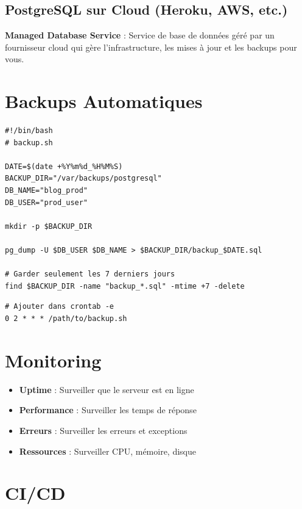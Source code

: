 \subsection{PostgreSQL sur Cloud (Heroku, AWS, etc.)}

\begin{definitionbox}
    \textbf{Managed Database Service} : Service de base de données géré par un fournisseur cloud qui gère l'infrastructure, les mises à jour et les backups pour vous.
\end{definitionbox}

\section{Backups Automatiques}

\begin{lstlisting}[style=bash, caption=Script de backup PostgreSQL]
#!/bin/bash
# backup.sh

DATE=$(date +%Y%m%d_%H%M%S)
BACKUP_DIR="/var/backups/postgresql"
DB_NAME="blog_prod"
DB_USER="prod_user"

mkdir -p $BACKUP_DIR

pg_dump -U $DB_USER $DB_NAME > $BACKUP_DIR/backup_$DATE.sql

# Garder seulement les 7 derniers jours
find $BACKUP_DIR -name "backup_*.sql" -mtime +7 -delete
\end{lstlisting}

\begin{lstlisting}[style=bash, caption=Automatisation avec cron]
# Ajouter dans crontab -e
0 2 * * * /path/to/backup.sh
\end{lstlisting}

\section{Monitoring}

\begin{itemize}
    \item \textbf{Uptime} : Surveiller que le serveur est en ligne
    \item \textbf{Performance} : Surveiller les temps de réponse
    \item \textbf{Erreurs} : Surveiller les erreurs et exceptions
    \item \textbf{Ressources} : Surveiller CPU, mémoire, disque
\end{itemize}

\section{CI/CD}

